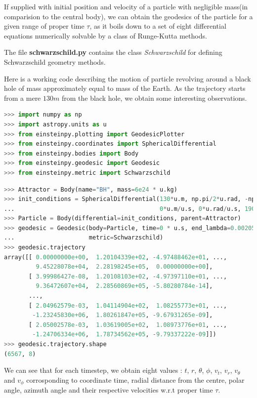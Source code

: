 \documentclass{aastex63}
\begin{document}
If supplied with initial position and velocity of a particle with negligible mass(in comparision to the central body), we can obtain the geodesics of the particle for a given range of proper time $\tau$, as it boils down to a set of eight differential equations numerically solvable by a class of Runge-Kutta methods.

The file \textbf{schwarzschild.py} contains the class \textit{Schwarzschild} for defining Schwarzschild geometry methods.

Here is a working code describing the motion of particle revolving around a black hole of mass approximately equal to mass of the Earth. As the trajectory starts from a mere $130m$ from the black hole, we obtain some interesting observations.

\begin{lstlisting}[language=Python, caption=Importing the required modules]
>>> import numpy as np
>>> import astropy.units as u
>>> from einsteinpy.plotting import GeodesicPlotter
>>> from einsteinpy.coordinates import SphericalDifferential
>>> from einsteinpy.bodies import Body
>>> from einsteinpy.geodesic import Geodesic
>>> from einsteinpy.metric import Schwarzschild
\end{lstlisting}

\begin{lstlisting}[language=Python, caption=Defining the attractor and the particle and calculating geodesics]
>>> Attractor = Body(name="BH", mass=6e24 * u.kg)
>>> init_conditions = SphericalDifferential(130*u.m, np.pi/2*u.rad, -np.pi/8*u.rad,
...                                         0*u.m/u.s, 0*u.rad/u.s, 1900*u.rad/u.s)
>>> Particle = Body(differential=init_conditions, parent=Attractor)
>>> geodesic = Geodesic(body=Particle, time=0 * u.s, end_lambda=0.00205, step_size=5e-8,
...                     metric=Schwarzschild)
>>> geodesic.trajectory
array([[ 0.00000000e+00,  1.20104339e+02, -4.97488462e+01, ...,
         9.45228078e+04,  2.28198245e+05,  0.00000000e+00],
       [ 3.99986427e-08,  1.20108103e+02, -4.97397110e+01, ...,
         9.36472607e+04,  2.28560869e+05, -5.80280784e-14],
       ...,
       [ 2.04962579e-03,  1.04114904e+02,  1.08255773e+01, ...,
        -1.23245830e+06,  1.80261847e+05, -9.67931265e-09],
       [ 2.05002578e-03,  1.03619005e+02,  1.08973776e+01, ...,
        -1.24706334e+06,  1.78734562e+05, -9.79337222e-09]])
>>> geodesic.trajectory.shape
(6567, 8)
\end{lstlisting}
We can see that for each timestep, we obtain eight values : $t$, $r$, $\theta$, $\phi$, $v_t$, $v_r$, $v_\theta$ and $v_\phi$ corrosponding to coordinate time, radial distance from the centre, polar angle, azimuth angle and their respective velocities w.r.t proper time $\tau$.
\end{document}
